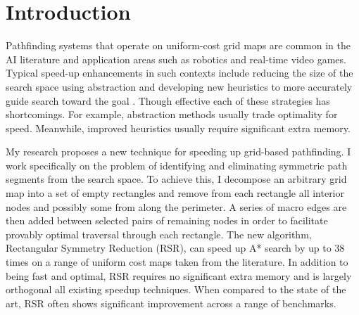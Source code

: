 \section{Introduction}
\label{sec:introduction}
Pathfinding systems that operate on uniform-cost grid maps are common in the AI
literature and application areas such as robotics and real-time
video games.  Typical speed-up enhancements in such contexts include reducing
the size of the search space using abstraction \cite{botea04} and developing new
heuristics to more accurately guide search toward the goal \cite{sturtevant09}.
Though effective each of these strategies has shortcomings.  For example,
abstraction methods usually trade optimality for speed.  Meanwhile, improved
heuristics usually require significant extra memory.
\par 
My research proposes a new technique for speeding up grid-based pathfinding.  I
work specifically on the problem of identifying and eliminating symmetric path
segments from the search space.  To achieve this, I decompose an arbitrary grid
map into a set of empty rectangles and remove from each rectangle all interior
nodes and possibly some from along the perimeter.  A series of macro edges are
then added between selected pairs of remaining nodes in order to facilitate
provably optimal traversal through each rectangle.  The new algorithm,
Rectangular Symmetry Reduction (RSR), can speed up A* search by up to 38
times on a range of uniform cost maps taken from the literature.  In addition to
being fast and optimal, RSR requires no significant extra memory and is largely
orthogonal all existing speedup techniques.  When compared to the state of the
art, RSR often shows significant improvement across a range of benchmarks.
